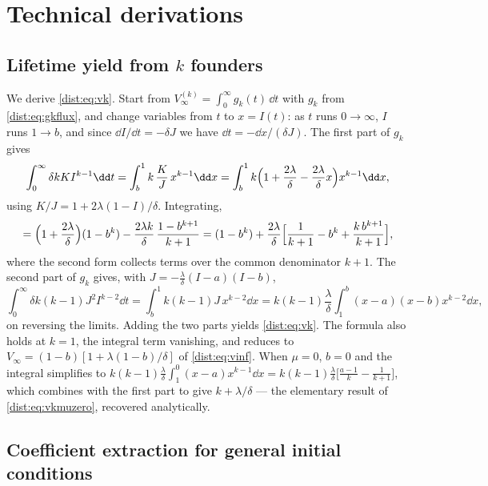 \section{Technical derivations}
\label{dist:app:technical}

\subsection{Lifetime yield from \texorpdfstring{$k$}{k} founders}
\label{dist:app:vk}

We derive \cref{dist:eq:vk}. Start from
$V_\infty^{(k)}=\int_0^\infty g_k(t)\,\dd t$ with $g_k$ from
\cref{dist:eq:gkflux}, and change variables from $t$ to $x=I(t)$: as $t$ runs
$0\to\infty$, $I$ runs $1\to b$, and since $\dd I/\dd t=-\delta J$ we have
$\dd t=-\dd x/(\delta J)$. The first part of $g_k$ gives
\[
\int_0^\infty\delta k K I^{k-1}\dd t
=\int_b^1 k\,\frac{K}{J}\,x^{k-1}\dd x
=\int_b^1 k\Bigl(1+\frac{2\lambda}{\delta}-\frac{2\lambda}{\delta}x\Bigr)
x^{k-1}\dd x,
\]
using $K/J=1+2\lambda(1-I)/\delta$. Integrating,
\[
=\Bigl(1+\frac{2\lambda}{\delta}\Bigr)(1-b^k)
-\frac{2\lambda k}{\delta}\,\frac{1-b^{k+1}}{k+1}
=(1-b^k)+\frac{2\lambda}{\delta}
\Bigl[\frac{1}{k+1}-b^k+\frac{k\,b^{k+1}}{k+1}\Bigr],
\]
where the second form collects terms over the common denominator $k+1$. The
second part of $g_k$ gives, with $J=-\frac{\lambda}{\delta}(I-a)(I-b)$,
\[
\int_0^\infty\delta k(k-1)J^2 I^{k-2}\dd t
=\int_b^1 k(k-1)J\,x^{k-2}\dd x
=k(k-1)\frac{\lambda}{\delta}\int_1^b (x-a)(x-b)x^{k-2}\dd x,
\]
on reversing the limits. Adding the two parts yields \cref{dist:eq:vk}. The
formula also holds at $k=1$, the integral term vanishing, and reduces to
$V_\infty=(1-b)[1+\lambda(1-b)/\delta]$ of \cref{dist:eq:vinf}. When $\mu=0$,
$b=0$ and the integral simplifies to
$k(k-1)\frac{\lambda}{\delta}\int_1^0(x-a)x^{k-1}\dd x
=k(k-1)\frac{\lambda}{\delta}\bigl[\frac{a-1}{k}-\frac{1}{k+1}\bigr]$, which
combines with the first part to give $k+\lambda/\delta$ --- the elementary
result of \cref{dist:eq:vkmuzero}, recovered analytically.

\subsection{Coefficient extraction for general initial conditions}
\label{dist:app:extract}

